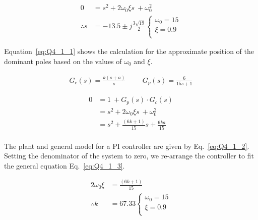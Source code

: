 \begin{equation}
\begin{split}
    0&=s^{2}+2\omega_{0}\xi s\ +\omega_{0}^{2}\\
    \therefore s&=-13.5\pm j\frac{3\sqrt{19}}{2}
    \begin{cases}
        \omega_0 = 15 \\
        \xi = 0.9 \\
    \end{cases}
\end{split}\label{eq:Q4_1_1}
\end{equation}

Equation~\eqref{eq:Q4_1_1} shows the calculation for the approximate position of the dominant poles based on the values of $\omega_0$ and $\xi$.

\begin{equation}
    \begin{split}
        G_{c}\left(s\right)=\frac{k\left(s+a\right)}{s} \hspace{1cm} G_{p}\left(s\right)=\frac{6}{15s+1}
    \end{split}\label{eq:Q4_1_2}
\end{equation}

\begin{equation}
    \begin{split}
        0&=1\ +G_{p}\left(s\right)\cdot G_{c}\left(s\right)\\
        &=s^{2}+2\omega_{0}\xi s\ +\omega_{0}^{2}\\
        &=s^{2}+\frac{\left(6k+1\right)}{15}s+\frac{6ka}{15} \\
    \end{split}\label{eq:Q4_1_3}
\end{equation}

The plant and general model for a PI controller are given by Eq.~\eqref{eq:Q4_1_2}. Setting the denominator of the system to zero, we re-arrange the controller to fit the general equation Eq.~\eqref{eq:Q4_1_3}.

\begin{equation}
    \begin{split}
        2\omega_{0}\xi &= \frac{\left(6k+1\right)}{15}\\
        \therefore k &= 67.33
        \begin{cases}
            \omega_0 = 15 \\
            \xi = 0.9 \\
        \end{cases}\\
    \end{split}\label{eq:Q4_1_4}
\end{equation}


